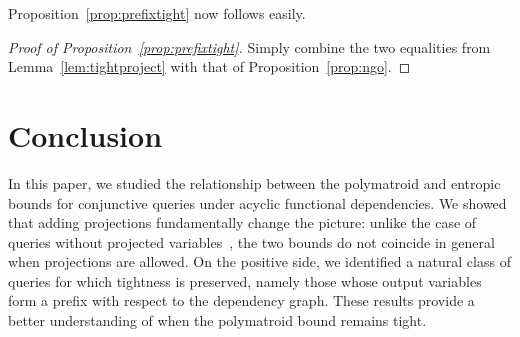 \documentclass[a4paper,cleveref]{lipics-v2021}
\begin{document}
Proposition~\ref{prop:prefixtight} now follows easily.

\begin{proof}[Proof of Proposition~\ref{prop:prefixtight}]
	Simply combine the two equalities from Lemma~\ref{lem:tightproject} with that of Proposition~\ref{prop:ngo}.
\end{proof}

\section{Conclusion}

In this paper, we studied the relationship between the polymatroid and entropic bounds for conjunctive queries under acyclic functional dependencies. 
We showed that adding projections fundamentally change the picture: unlike the case of queries without projected variables~\cite{ngo2018worstb}, the two bounds do not coincide in general when projections are allowed. 
On the positive side, we identified a natural class of queries for which tightness is preserved, namely those whose output variables form a prefix with respect to the dependency graph. 
These results provide a better understanding of when the polymatroid bound remains tight.
\end{document}
